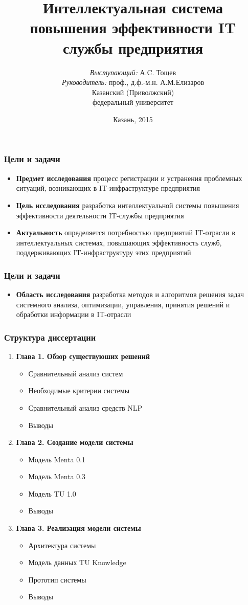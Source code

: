 \documentclass[14pt]{beamer}
\title{\small{Интеллектуальная система повышения эффективности IT службы предприятия}}
\author{\small{%
\emph{Выступающий:} А.C. Тощев\\%
\emph{Руководитель:} проф., д.ф.-м.н. А.М.Елизаров}\\%
\vspace{30pt}%
Казанский (Приволжский)\\
федеральный университет%
\vspace{20pt}%
}
\date{\small{Казань, 2015}}
\begin{document}
\maketitle

\begin{frame}
\frametitle{Цели и задачи}
\begin{itemize}
  \item \textbf{Предмет исследования} процесс регистрации и устранения проблемных ситуаций, возникающих в IT-инфраструктуре предприятия 
  \item \textbf{Цель исследования}  разработка интеллектуальной системы повышения эффективности деятельности IT-службы предприятия
  \item \textbf{Актуальность} определяется потребностью предприятий IT-отрасли в интеллектуальных системах, повышающих эффективность служб, поддерживающих IT-инфраструктуру этих предприятий
\end{itemize}
\end{frame}

\begin{frame}
\frametitle{Цели и задачи}
\begin{itemize}
    \item \textbf{Область исследования} разработка методов и алгоритмов решения задач системного анализа, оптимизации, управления, принятия решений и обработки информации в IT-отрасли %
\end{itemize}
\end{frame}

\begin{frame}
\frametitle{Структура диссертации}
\begin{enumerate}
  \item \textbf{Глава 1. Обзор существуюших решений}
  \begin{itemize}
    \item Сравнительный анализ систем
    \item Необходимые критерии системы
    \item Сравнительный анализ средств NLP
    \item Выводы
  \end{itemize}
  \item \textbf{Глава 2. Создание модели системы}
  \begin{itemize}
    \item Модель Menta 0.1
    \item Модель Menta 0.3
    \item Модель TU 1.0
    \item Выводы
  \end{itemize}
  \item \textbf{Глава 3. Реализация модели системы}
  \begin{itemize}
    \item Архитектура системы
    \item Модель данных TU Knowledge
    \item Прототип системы
    \item Выводы
  \end{itemize}
 \end{enumerate}
\end{frame}
\end{document}
